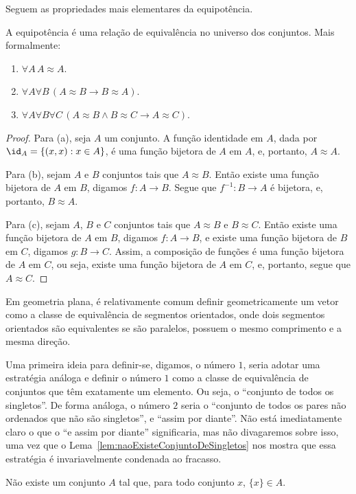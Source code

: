Seguem as propriedades mais elementares da equipotência.
\begin{proposition}[$\BST$]\label{prop:equipotenciaEquivalencia}
    A equipotência é uma relação de equivalência no universo dos conjuntos.
    Mais formalmente:
    \begin{enumerate}[label=(\alph*)]
        \item $\forall A \, A\approx A$.
        \item $\forall A \forall B\, (A \approx B \rightarrow B \approx A)$.
        \item $\forall A \forall B \forall C\, (A \approx B \land B \approx C \rightarrow A \approx C)$.
    \end{enumerate}
\end{proposition}
\begin{proof}
    Para (a), seja $A$ um conjunto.
    A função identidade em $A$, dada por $\id_A = \{(x, x) : x \in A\}$, é uma função bijetora de $A$ em $A$, e, portanto, $A \approx A$.

    Para (b), sejam $A$ e $B$ conjuntos tais que $A \approx B$.
    Então existe uma função bijetora de $A$ em $B$, digamos $f:A\to B$.
    Segue que $f^{-1}:B\to A$ é bijetora, e, portanto, $B \approx A$.

    Para (c), sejam $A$, $B$ e $C$ conjuntos tais que $A \approx B$ e $B \approx C$.
    Então existe uma função bijetora de $A$ em $B$, digamos $f:A\to B$, e existe uma função bijetora de $B$ em $C$, digamos $g:B\to C$.
    Assim, a composição de funções é uma função bijetora de $A$ em $C$, ou seja, existe uma função bijetora de $A$ em $C$, e, portanto, segue que $A \approx C$.
\end{proof}

Em geometria plana, é relativamente comum definir geometricamente um vetor como a classe de equivalência de segmentos orientados, onde dois segmentos orientados são equivalentes se são paralelos, possuem o mesmo comprimento e a mesma direção.

Uma primeira ideia para definir-se, digamos, o número $1$, seria adotar uma estratégia análoga e definir o número $1$ como a classe de equivalência de conjuntos que têm exatamente um elemento.
Ou seja, o ``conjunto de todos os singletos''.
De forma análoga, o número $2$ seria o ``conjunto de todos os pares não ordenados que não são singletos'', e ``assim por diante''.
Não está imediatamente claro o que o ``e assim por diante'' significaria, mas não divagaremos sobre isso, uma vez que o Lema~\ref{lem:naoExisteConjuntoDeSingletos} nos mostra que essa estratégia é invariavelmente condenada ao fracasso.
\begin{lemma}[$\BST$]\label{lem:naoExisteConjuntoDeSingletos}
    Não existe um conjunto $A$ tal que, para todo conjunto $x$, $\{x\} \in A$.
\end{lemma}

